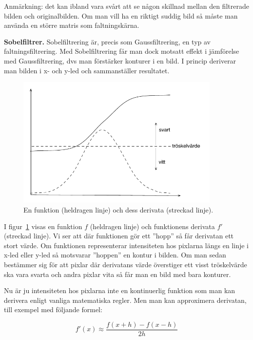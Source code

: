 Anmärkning: det kan ibland vara svårt att se någon skillnad mellan den filtrerade bilden och originalbilden. Om man vill ha en riktigt suddig bild så måste man använda en större matris som faltningskärna.


\Task  \textbf{Sobelfiltrer.} Sobelfiltrering är, precis som Gaussfiltrering, en typ av faltningsfiltrering. Med Sobelfiltrering får man dock motsatt effekt i jämförelse med Gaussfiltrering, dvs man förstärker konturer i en bild. I princip deriverar man bilden i x- och y-led och sammanställer resultatet.

\begin{figure}[H]
\includegraphics[width=0.9\textwidth]{../img/w12-assignment-photo/derivatabild2.pdf}
\caption { En funktion (heldragen linje) och dess derivata (streckad linje).}
\label{fig:photo:sobelfilter:derivatabild}
\end{figure}

I figur~\ref{fig:photo:sobelfilter:derivatabild} visas en funktion $f$ (heldragen linje) och funktionens derivata $f'$ (streckad linje). Vi ser att där funktionen gör ett ''hopp'' så får derivatan ett stort värde. Om funktionen representerar intensiteten hos pixlarna längs en linje i x-led eller y-led så motsvarar ''hoppen'' en kontur i bilden. Om man sedan bestämmer sig för att pixlar där derivatans värde överstiger ett visst tröskelvärde ska vara svarta och andra pixlar vita så får man en bild med bara konturer.

Nu är ju intensiteten hos pixlarna inte en kontinuerlig funktion som man kan derivera enligt vanliga matematiska regler. Men man kan approximera derivatan, till exempel med följande formel:

\begin{displaymath}
f'(x) \approx \frac{f(x+h) - f(x-h)}{2h}
\end{displaymath}

